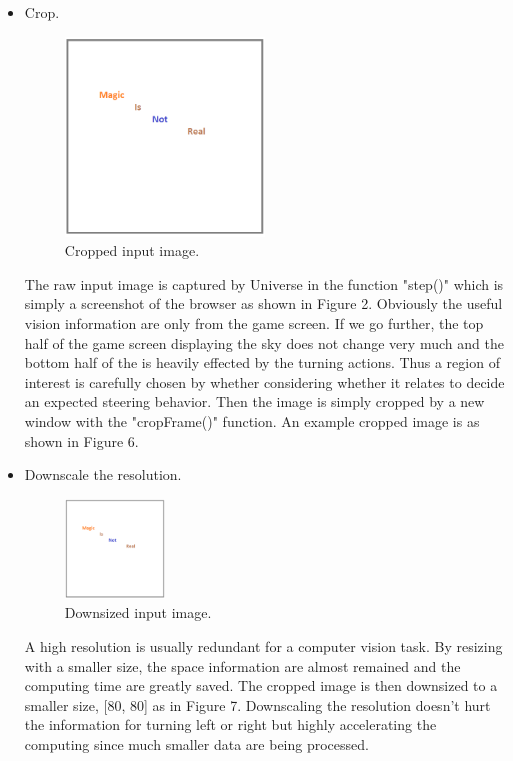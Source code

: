 \begin{itemize}

    \item Crop.
    
    	\begin{figure}[h]
   	 \centering
   	 \includegraphics[width=0.5\textwidth]{figs/magic}
    	\caption{Cropped input image.}
    	\end{figure}
    
    The raw input image is captured by Universe in the function "step()" which is simply a screenshot of the browser as shown in Figure 2. Obviously the useful vision information are only from the game screen. If we go further, the top half of the game screen displaying the sky does not change very much and the bottom half of the is heavily effected by the turning actions. Thus a region of interest is carefully chosen by whether considering whether it relates to decide an expected steering behavior.  Then the image is simply cropped by a new window with the "cropFrame()" function. An example cropped image is as shown in Figure 6.   
    
    \item Downscale the resolution.

    	\begin{figure}[h]
    	\centering
   	 \includegraphics[width=0.25\textwidth]{figs/magic}
   	 \caption{Downsized input image.}
    	\end{figure}
    
    A high resolution is usually redundant for a computer vision task. By resizing with a smaller size, the space information are almost remained and the computing time are greatly saved. The cropped image is then downsized to a smaller size, [80, 80] as in Figure 7. Downscaling the resolution doesn't hurt the information for turning left or right but highly accelerating the computing since much smaller data are being processed.
    

\end{itemize}
